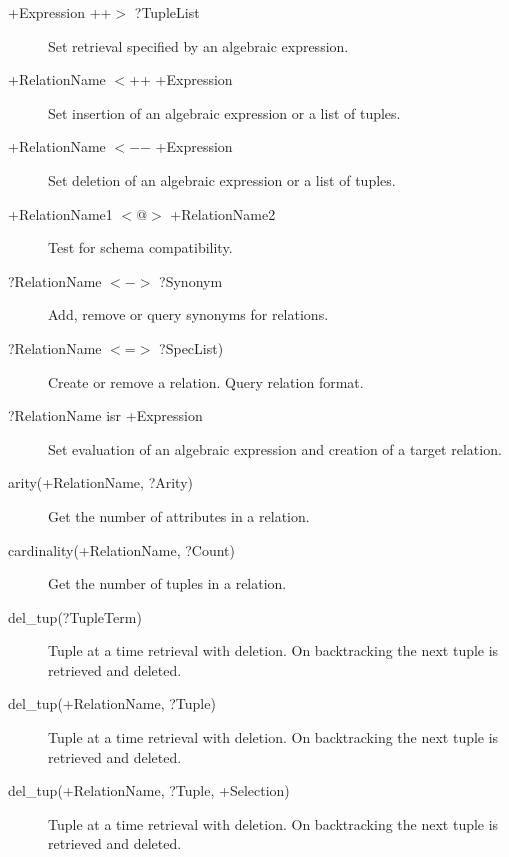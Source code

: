 \begin{description}
\item[+Expression \hspace{1mm} ++$>$ \hspace{1mm} ?TupleList]{Set retrieval specified by an algebraic expression.}
\item[+RelationName \hspace{1mm} $<$++ \hspace{1mm} +Expression]{Set insertion of an algebraic expression or a list of tuples.}
\item[+RelationName \hspace{1mm} $<$$-$$-$ \hspace{1mm} +Expression]{Set deletion of an algebraic expression or a list of tuples.}
\item[+RelationName1 \hspace{1mm} $<$@$>$ \hspace{1mm} +RelationName2]{Test for schema compatibility.}
\item[?RelationName \hspace{1mm} $<$$-$$>$ \hspace{1mm} ?Synonym]{Add, remove or query synonyms for relations.}
\item[?RelationName \hspace{1mm} $<$=$>$ \hspace{1mm} ?SpecList)]{Create or remove a relation. Query relation format.}
\item[?RelationName isr +Expression]{Set evaluation of an algebraic expression and creation of a target relation.}
\item[arity(+RelationName, ?Arity)]{Get the number of attributes in a relation.}
\item[cardinality(+RelationName, ?Count)]{Get the number of tuples in a relation.}
\item[del_tup(?TupleTerm)]{Tuple at a time retrieval with deletion. On backtracking the next tuple is retrieved and deleted.}
\item[del_tup(+RelationName, ?Tuple)]{Tuple at a time retrieval with deletion. On backtracking the next tuple is retrieved and deleted.}
\item[del_tup(+RelationName, ?Tuple, +Selection)]{Tuple at a time retrieval with deletion. On backtracking the next tuple is retrieved and deleted.}

\end{description}
